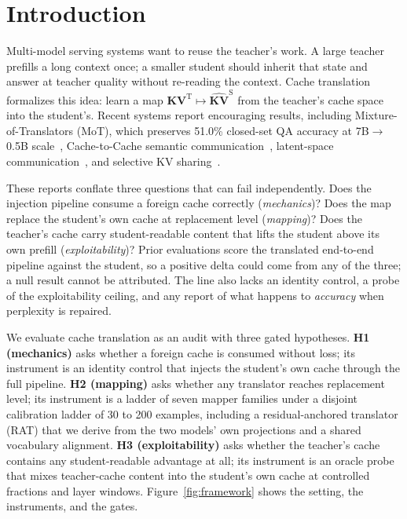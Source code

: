 \documentclass{article} %
\begin{document}
\section{Introduction}
\label{sec:intro}

Multi-model serving systems want to reuse the teacher's work. A large teacher
prefills a long context once; a smaller student should inherit that state and
answer at teacher quality without re-reading the context. Cache translation
formalizes this idea: learn a map $\mathbf{KV}^{\mathrm{T}} \mapsto
\widehat{\mathbf{KV}}^{\mathrm{S}}$ from the teacher's cache space into the
student's. Recent systems report encouraging results, including
Mixture-of-Translators (MoT), which preserves 51.0\% closed-set QA accuracy at
7B$\to$0.5B scale~\citep{mot2026}, Cache-to-Cache semantic
communication~\citep{c2c2025}, latent-space
communication~\citep{lsc2026}, and selective KV
sharing~\citep{kvcomm2025}.

These reports conflate three questions that can fail independently. Does the
injection pipeline consume a foreign cache correctly (\emph{mechanics})? Does
the map replace the student's own cache at replacement level (\emph{mapping})?
Does the teacher's cache carry student-readable content that lifts the student
above its own prefill (\emph{exploitability})? Prior evaluations score the
translated end-to-end pipeline against the student, so a positive delta could
come from any of the three; a null result cannot be attributed. The line also
lacks an identity control, a probe of the exploitability ceiling, and any
report of what happens to \emph{accuracy} when perplexity is repaired.

We evaluate cache translation as an audit with three gated hypotheses.
\textbf{H1 (mechanics)} asks whether a foreign cache is consumed without loss;
its instrument is an identity control that injects the student's own cache
through the full pipeline. \textbf{H2 (mapping)} asks whether any translator
reaches replacement level; its instrument is a ladder of seven mapper families
under a disjoint calibration ladder of 30 to 200 examples, including a
residual-anchored translator (RAT) that we derive from the two models' own
projections and a shared vocabulary alignment. \textbf{H3 (exploitability)}
asks whether the teacher's cache contains any student-readable advantage at
all; its instrument is an oracle probe that mixes teacher-cache content into
the student's own cache at controlled fractions and layer windows. Figure~\ref{fig:framework}
shows the setting, the instruments, and the gates.
\end{document}
